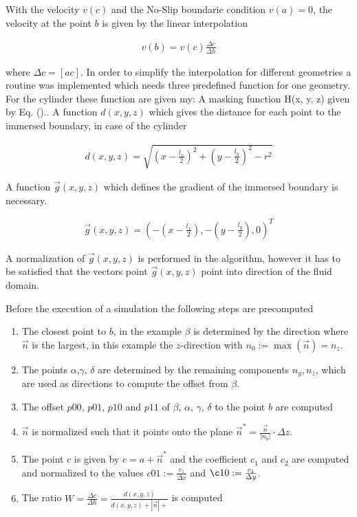 With the velocity $v(c)$ and  the No-Slip boundarie condition $v(a) = 0$,
the velocity at the point $b$ is given by the linear interpolation

\begin{align}
    v(b)  =  v(c)\frac{\Delta c}{\Delta h}
\end{align}

where $\Delta c = [ac]$.
In order to simplify the interpolation for different geometries a routine was implemented which needs three predefined function for one geometry.
For the cylinder these function are given my:
A masking function H(x, y, z)  given by Eq. ()..
A function $d(x, y, z)$ which gives the distance for each point to the immersed boundary, in case of the cylinder

\begin{align}
    d(x, y, z) = \sqrt{\left(x - \frac{l_x}{2}\right)^2 + \left(y - \frac{l_y}{2}\right)^2  - r^2}
\end{align}

A function $\vec{g}(x,y,z )$ which defines the gradient of the immersed boundary is necessary.

\begin{align}
    \vec{g}(x, y, z) = \left(-\left(x - \frac{l_x}{2}\right),  - \left(y - \frac{l_y}{2}\right), 0\right)^T
\end{align}

A normalization of $\vec{g}(x, y, z)$ is performed in the algorithm, however it has to be satisfied that the vectors point $\vec{g}(x, y, z)$ point into direction of the fluid domain.


Before the execution of a simulation the following steps are precomputed

\begin{enumerate}
    \item The closest point to $b$, in the example  $\beta$ is determined by the direction where $\vec{n}$ is the largest, in this example
          the $z$-direction with $n_0 := \max(\vec{n}) = n_z$.

    \item The points $\alpha$,$\gamma$, $\delta$ are determined by the remaining components ${n_y, n_z}$, which are used as directions to
            compute the offset from $\beta$.

    \item The offset $p00$, $p01$, $p10$ and $p11$  of  $\beta$, $\alpha$, $\gamma$, $\delta$ to the point $b$ are computed

    \item $\vec{n}$ is normalized such that it points onto the plane $\vec{n}^* = \frac{\vec{n}}{|n_0|}\cdot \Delta z$.

    \item The point $c$ is given by $c = a + \vec{n}^*$ and the coefficient $c_1$ and $c_2$ are computed and normalized to the values
           $c01 := \frac{c_1}{\Delta x}$ and $\c10 := \frac{c_1}{\Delta y}$.
    \item The ratio $W=\frac{\Delta c}{\Delta h} = \frac{d(x, y, z)}{d(x, y, z) + |\vec{n}| + }$ is computed
\end{enumerate}



